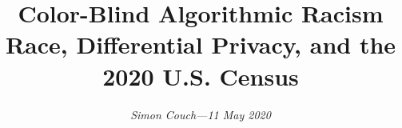 \documentclass[12pt]{article}
\begin{document}
\makeatletter
\renewcommand\section{\@startsection {section}{1}{\z@}%
                                   {-1.5ex\@plus -1ex \@minus -.2ex}%
                                   {.75ex \@plus .2ex}%
                                   {\normalfont\normalsize\bfseries}}%
\renewcommand\subsection{\@startsection{subsection}{2}{\z@}%
                                   {-1.0ex\@plus -1ex \@minus -.2ex}%
                                   {.5ex \@plus .2ex}%
                                   {\normalfont\normalsize\itshape}}%
\makeatother


\title{\vspace{-10pt} 
  Color-Blind Algorithmic Racism \\
  \large Race, Differential Privacy, and the 2020 U.S. Census}
       
\author{\vspace{-20pt} \normalsize \textit{Simon Couch—11 May 2020}}

\date{}

\maketitle

\doublespace







\clearpage




\clearpage

\appendix

\end{document}

